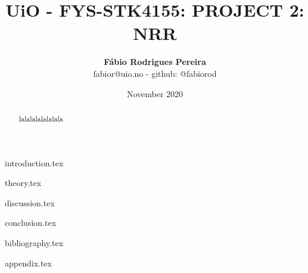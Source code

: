 \documentclass{article}
\title{UiO - FYS-STK4155: PROJECT 2: NRR}
\author{\textbf{Fábio Rodrigues Pereira} \\ \small fabior@uio.no - github: @fabiorod}
\date{November 2020}
\begin{document}
\maketitle
\begin{abstract}
\noindent lalalalalalalala
\end{abstract}

\clearpage
\thispagestyle{empty}

\tableofcontents

\clearpage
\thispagestyle{empty}

{introduction.tex}

\clearpage
\thispagestyle{empty}

{theory.tex}

\clearpage
\thispagestyle{empty}

{discussion.tex}

\clearpage
\thispagestyle{empty}

{conclusion.tex}

\clearpage
\thispagestyle{empty}

{bibliography.tex}

\clearpage
\thispagestyle{empty}

{appendix.tex}
\end{document}
